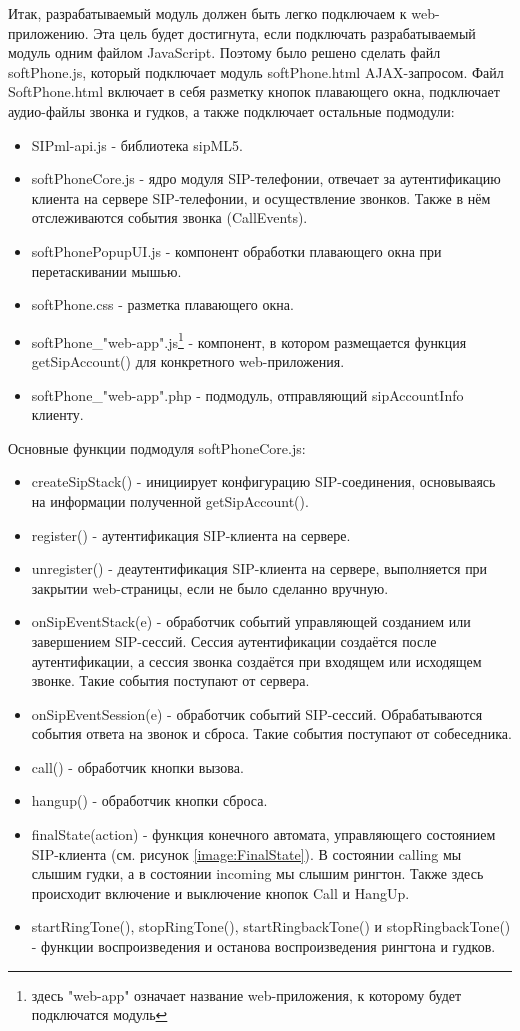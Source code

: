 Итак, разрабатываемый модуль должен быть легко подключаем к web-приложению. Эта цель будет достигнута, если подключать разрабатываемый модуль одним файлом JavaScript. Поэтому было решено сделать файл softPhone.js, который подключает модуль softPhone.html AJAX-запросом. Файл SoftPhone.html включает в себя разметку кнопок плавающего окна, подключает аудио-файлы звонка и гудков, а также подключает остальные подмодули:
\begin{itemize}
\item SIPml-api.js - библиотека sipML5.
\item softPhoneCore.js - ядро модуля SIP-телефонии, отвечает за аутентификацию клиента на сервере SIP-телефонии, и осуществление звонков. Также в нём отслеживаются события звонка (CallEvents).
\item softPhonePopupUI.js - компонент обработки плавающего окна при перетаскивании мышью.
\item softPhone.css - разметка плавающего окна.
\item softPhone\_"web-app".js\footnote{здесь "web-app" означает название web-приложения, к которому будет подключатся модуль} - компонент, в котором размещается функция getSipAccount() для конкретного web-приложения.
\item softPhone\_"web-app".php - подмодуль, отправляющий sipAccountInfo клиенту.
\end{itemize}

Основные функции подмодуля softPhoneCore.js:
\begin{itemize}
\item createSipStack() - инициирует конфигурацию SIP-соединения, основываясь на информации полученной getSipAccount().
\item register() - аутентификация SIP-клиента на сервере.
\item unregister() - деаутентификация SIP-клиента на сервере, выполняется при закрытии web-страницы, если не было сделанно вручную.
\item onSipEventStack(e) - обработчик событий управляющей созданием или завершением SIP-сессий. Сессия аутентификации создаётся после аутентификации, а сессия звонка создаётся при входящем или исходящем звонке. Такие события поступают от сервера.
\item onSipEventSession(e) - обработчик событий SIP-сессий. Обрабатываются события ответа на звонок и сброса. Такие события поступают от собеседника.
\item call() - обработчик кнопки вызова.
\item hangup() - обработчик кнопки сброса.
\item finalState(action) - функция конечного автомата, управляющего состоянием SIP-клиента (см. рисунок \ref{image:FinalState}). В состоянии calling мы слышим гудки, а в состоянии incoming мы слышим рингтон. Также здесь происходит включение и выключение кнопок Call и HangUp.
\item startRingTone(), stopRingTone(), startRingbackTone() и stopRingbackTone() - функции воспроизведения и останова воспроизведения рингтона и гудков.
\end{itemize}

